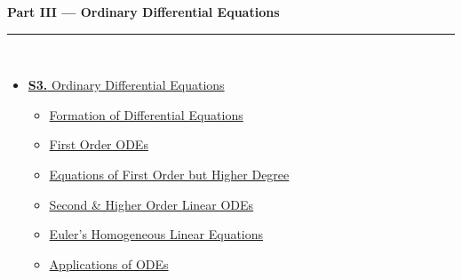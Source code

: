 \documentclass[12pt,a4paper]{article}
\begin{document}
\begin{tcolorbox}[breakable,colback=cC!5,colframe=cC,boxrule=1pt,arc=5pt,
  left=8pt,right=8pt,top=8pt,bottom=8pt,before skip=4pt]
  {\large\bfseries\textcolor{cC}{Part III --- Ordinary Differential Equations}}\\[5pt]
  \textcolor{cC!40}{\rule{\textwidth}{0.4pt}}\\[3pt]
  \small\begin{itemize}[leftmargin=1.2em,itemsep=1pt,label={\textcolor{cC}{$\triangleright$}}]
    \item \hyperref[sec:S3]{\textbf{S3.} Ordinary Differential Equations}
      \begin{itemize}[leftmargin=1.5em,itemsep=0pt,label={\textcolor{cC}{$\cdot$}}]
        \item \hyperref[sub:s3-formation]{Formation of Differential Equations}
        \item \hyperref[sub:s3-first]{First Order ODEs}
        \item \hyperref[sub:s3-higherdeg]{Equations of First Order but Higher Degree}
        \item \hyperref[sub:s3-linear]{Second \& Higher Order Linear ODEs}
        \item \hyperref[sub:s3-euler]{Euler's Homogeneous Linear Equations}
        \item \hyperref[sub:s3-applications]{Applications of ODEs}
      \end{itemize}
  \end{itemize}
\end{tcolorbox}

\vspace{6pt}
\end{document}
